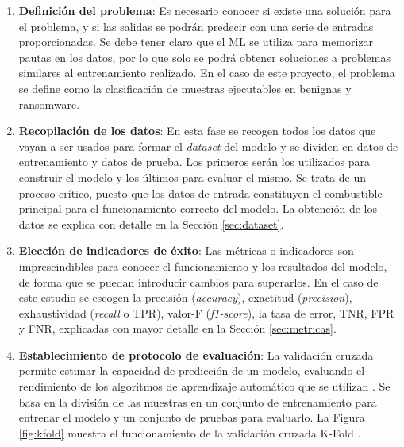 \begin{enumerate}
    \item \textbf{Definición del problema}: Es necesario conocer si existe una solución para el problema, y si las salidas se podrán predecir con una serie de entradas proporcionadas. Se debe tener claro que el \gls{ML} se utiliza para memorizar pautas en los datos, por lo que solo se podrá obtener soluciones a problemas similares al entrenamiento realizado. En el caso de este proyecto, el problema se define como la clasificación de muestras ejecutables en benignas y ransomware.
    
    \item \textbf{Recopilación de los datos}: En esta fase se recogen todos los datos que vayan a ser usados para formar el \textit{dataset} del modelo y se dividen en datos de entrenamiento y datos de prueba. Los primeros serán los utilizados para construir el modelo y los últimos para evaluar el mismo. Se trata de un proceso crítico, puesto que los datos de entrada constituyen el combustible principal para el funcionamiento correcto del modelo. La obtención de los datos se explica con detalle en la Sección \ref{sec:dataset}.
    
    \item \textbf{Elección de indicadores de éxito}: Las métricas o indicadores son imprescindibles para conocer el funcionamiento y los resultados del modelo, de forma que se puedan introducir cambios para superarlos. En el caso de este estudio se escogen la precisión (\textit{accuracy}), exactitud (\textit{precision}), exhaustividad (\textit{recall} o \gls{TPR}), valor-F (\textit{f1-score}), la tasa de error, \gls{TNR}, \gls{FPR} y \gls{FNR}, explicadas con mayor detalle en la Sección \ref{sec:metricas}.
    
    \item \textbf{Establecimiento de protocolo de evaluación}: La validación cruzada permite estimar la capacidad de predicción de un modelo, evaluando el rendimiento de los algoritmos de aprendizaje automático que se utilizan \cite{automatic}. Se basa en la división de las muestras en un conjunto de entrenamiento para entrenar el modelo y un conjunto de pruebas para evaluarlo. La Figura \ref{fig:kfold} muestra el funcionamiento de la validación cruzada K-Fold \cite{6226477}.
    

\end{enumerate}
